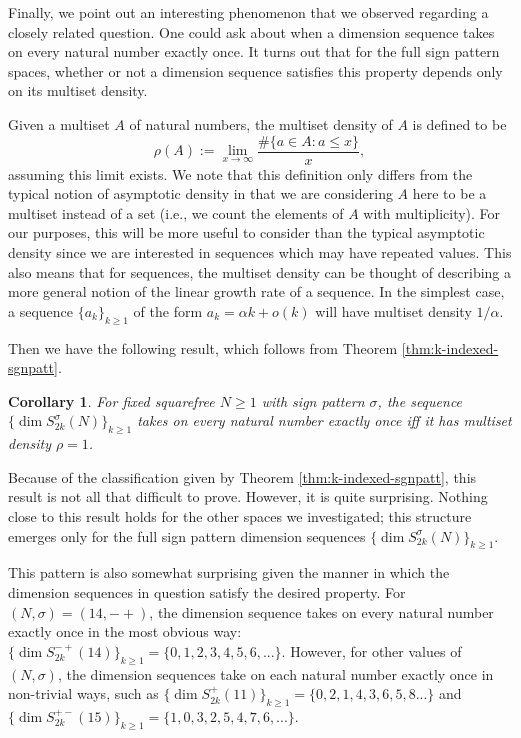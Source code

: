 \documentclass[12pt,letterpaper,reqno]{amsart}
\newtheorem{corollary}[theorem]{Corollary}
\theoremstyle{definition}
\numberwithin{equation}{section}
\numberwithin{figure}{section}
\numberwithin{table}{section}
\begin{document}
Finally, we point out an interesting phenomenon that we observed regarding a closely related question.
One could ask about when a dimension sequence takes on every natural number exactly once. 
It turns out that for the full sign pattern spaces, whether or not
a dimension sequence satisfies this property 
depends only on its multiset density.

Given a multiset $A$ of natural numbers, the multiset density of $A$ is defined to be
$$
\rho(A) := \lim_{x \to \infty} \frac{ \#\{a \in A \colon a \le x\} }{ x },
$$
assuming this limit exists.
We note that this definition only differs from the typical notion of asymptotic density in that we are considering $A$ here to be a multiset instead of a set (i.e., we count the elements of $A$ with multiplicity). For our purposes, this will be more useful to consider than 
the typical asymptotic density since we are interested in
sequences which may have repeated values.
This also means that for sequences, the multiset density can be thought of describing a more general notion of the linear growth rate of a sequence. In the simplest case, a sequence $\{a_k\}_{k\ge1}$ of the form $a_k = \alpha k + o(k)$ will have multiset density  $1/\alpha$.

Then we have the following result, which follows from Theorem \ref{thm:k-indexed-sgnpatt}.
\begin{corollary} \label{cor:k-indexed-sgnpatt}
For fixed squarefree $N \ge 1$ with sign pattern $\sigma$, the sequence $\{ \dim S_{2k}^\sigma(N) \}_{k\ge1}$ takes on every natural number exactly once iff it has multiset density $\rho = 1$.
\end{corollary}

Because of the classification given by Theorem \ref{thm:k-indexed-sgnpatt}, this result is not all that difficult to prove.
However, it is quite surprising. 
Nothing close to this result holds for the other spaces we investigated; this structure emerges only for 
the full sign pattern dimension sequences $\{ \dim S_{2k}^\sigma(N) \}_{k\ge1}$.

This pattern is also somewhat surprising given the manner in which the 
dimension sequences in question satisfy the desired property. 
For $(N,\sigma)=(14,-+)$, the dimension sequence takes on every natural 
number exactly once in the most obvious way:\\
$\{ \dim S_{2k}^{-+}(14) \}_{k\ge1} = \{0,1,2,3,4,5,6,...\}$.
However, for other values of $(N,\sigma)$, the dimension sequences take on each natural number exactly once in non-trivial ways, such as
$\{ \dim S_{2k}^+(11) \}_{k\ge1}  = \{0,2,1,4,3,6,5,8...\}$ and  $\{ \dim S_{2k}^{+-}(15) \}_{k\ge1}  = \{1,0,3,2,5,4,7,6,...\}$.
\end{document}
